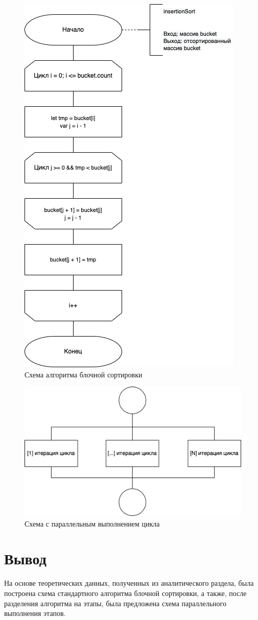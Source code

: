\begin{figure}[h!]
	\centering
	\includegraphics[width=0.6\linewidth]{img/Insertion.png}
	\caption{Схема алгоритма блочной сортировки}
	\label{fig:alg3}
\end{figure}


\begin{figure}[h!]
	\centering
	\includegraphics[width=0.6\linewidth]{img/Threads.png}
	\caption{Схема с параллельным выполнением цикла}
	\label{fig:alg4}
\end{figure}


\section{Вывод}
На основе теоретических данных, полученных из аналитического раздела, была построена схема стандартного алгоритма блочной сортировки, а также, после разделения алгоритма на этапы, была предложена схема параллельного выполнения этапов.
